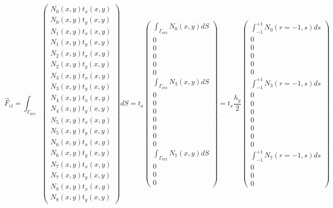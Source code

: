 \[
\vec{F}_{el}=
\int_{\Gamma_{073}} 
\left(
\begin{array}{c}
N_0(x,y) t_x(x,y)\\
N_0(x,y) t_y(x,y)\\
N_1(x,y) t_x(x,y)\\
N_1(x,y) t_y(x,y)\\
N_2(x,y) t_x(x,y)\\
N_2(x,y) t_y(x,y)\\
N_3(x,y) t_x(x,y)\\
N_3(x,y) t_y(x,y)\\
N_4(x,y) t_x(x,y)\\
N_4(x,y) t_y(x,y)\\
N_5(x,y) t_x(x,y)\\
N_5(x,y) t_y(x,y)\\
N_6(x,y) t_x(x,y)\\
N_6(x,y) t_y(x,y)\\
N_7(x,y) t_x(x,y)\\
N_7(x,y) t_y(x,y)\\
N_8(x,y) t_x(x,y)\\
N_8(x,y) t_y(x,y)
\end{array}
\right)
dS
=
t_x 
\left(
\begin{array}{c}
\int_{\Gamma_{073}} N_0(x,y) dS\\
0 \\ 0 \\ 0 \\ 0 \\ 0 \\
\int_{\Gamma_{073}} N_3(x,y) dS \\
0 \\ 0 \\ 0 \\ 0 \\ 0 \\ 0 \\ 0 \\
\int_{\Gamma_{073}}  N_7(x,y) dS \\
0 \\ 0 \\ 0
\end{array}
\right)
=
t_x  \frac{h_y}{2}
\left(
\begin{array}{c}
\int_{-1}^{+1} N_0(r=-1,s) ds\\
0 \\ 0 \\ 0 \\ 0 \\ 0 \\
\int_{-1}^{+1} N_3(r=-1,s) ds \\
0 \\ 0 \\ 0 \\ 0 \\ 0 \\ 0 \\ 0 \\
\int_{-1}^{+1}  N_7(r=-1,s) ds \\
0 \\ 0 \\ 0
\end{array}
\right)
\]
